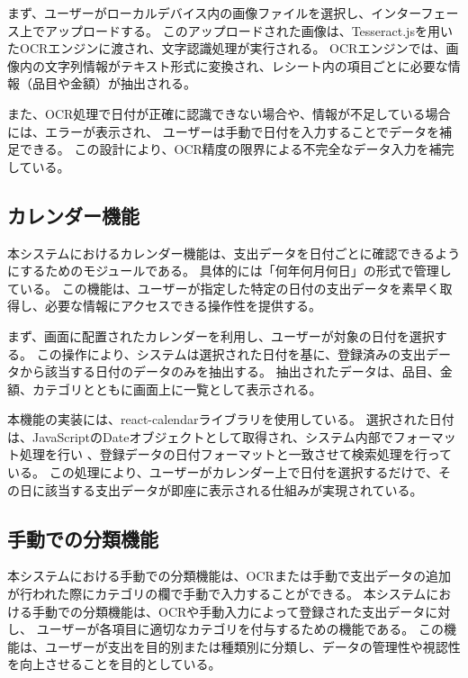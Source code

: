 \documentclass[main]{subfiles}
\begin{document}
まず、ユーザーがローカルデバイス内の画像ファイルを選択し、インターフェース上でアップロードする。
このアップロードされた画像は、Tesseract.jsを用いたOCRエンジンに渡され、文字認識処理が実行される。
OCRエンジンでは、画像内の文字列情報がテキスト形式に変換され、レシート内の項目ごとに必要な情報（品目や金額）が抽出される。

また、OCR処理で日付が正確に認識できない場合や、情報が不足している場合には、エラーが表示され、
ユーザーは手動で日付を入力することでデータを補足できる。
この設計により、OCR精度の限界による不完全なデータ入力を補完している。
\subsection{カレンダー機能}

本システムにおけるカレンダー機能は、支出データを日付ごとに確認できるようにするためのモジュールである。
具体的には「何年何月何日」の形式で管理している。
この機能は、ユーザーが指定した特定の日付の支出データを素早く取得し、必要な情報にアクセスできる操作性を提供する。

まず、画面に配置されたカレンダーを利用し、ユーザーが対象の日付を選択する。
この操作により、システムは選択された日付を基に、登録済みの支出データから該当する日付のデータのみを抽出する。
抽出されたデータは、品目、金額、カテゴリとともに画面上に一覧として表示される。

本機能の実装には、react-calendarライブラリを使用している。
選択された日付は、JavaScriptのDateオブジェクトとして取得され、システム内部でフォーマット処理を行い
、登録データの日付フォーマットと一致させて検索処理を行っている。
この処理により、ユーザーがカレンダー上で日付を選択するだけで、その日に該当する支出データが即座に表示される仕組みが実現されている。
\subsection{手動での分類機能}

本システムにおける手動での分類機能は、OCRまたは手動で支出データの追加が行われた際にカテゴリの欄で手動で入力することができる。
本システムにおける手動での分類機能は、OCRや手動入力によって登録された支出データに対し、
ユーザーが各項目に適切なカテゴリを付与するための機能である。
この機能は、ユーザーが支出を目的別または種類別に分類し、データの管理性や視認性を向上させることを目的としている。
\end{document}
